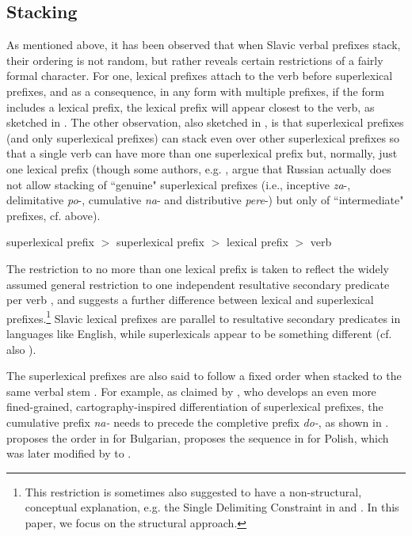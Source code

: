 \documentclass[output=paper,colorlinks,citecolor=brown]{langscibook}
\begin{document}
\subsection{Stacking}\label{sec:IntroStacking}

As mentioned above, it has been observed that when Slavic verbal prefixes stack, their ordering is not random, but rather reveals certain restrictions of a fairly formal character. For one, lexical prefixes attach  to the verb before superlexical prefixes, and as a consequence, in any form with multiple prefixes, if the form includes a lexical prefix, the lexical prefix will appear closest to the verb, as sketched in . The other observation, also sketched in , is that superlexical prefixes (and only superlexical prefixes) can stack even over other superlexical prefixes so that a single verb can have more than one superlexical prefix but, normally, just one lexical prefix \citep[cf.][]{Romanova2004,svenonius2004slavic,gehrke2008ps} (though some authors, e.g. \citealt{tatevosov2008intermediate}, argue that Russian actually does not allow stacking of ``genuine" superlexical prefixes (i.e., inceptive \textit{za}-, delimitative \textit{po}-, cumulative \textit{na}- and distributive \textit{pere}-) but only of ``intermediate" prefixes, cf. above).

\ea superlexical prefix $>$  superlexical prefix $>$ lexical prefix $>$ verb \label{ex:orderprefixes}
\z

\noindent The restriction to no more than one lexical prefix is taken to reflect the widely assumed general restriction to one independent resultative secondary predicate per verb \citep[a.o.][]{rappaport2001event,ramchand2008verb}, and suggests a further difference between lexical and superlexical prefixes.\footnote{This restriction is sometimes also suggested to have a non-structural, conceptual explanation, e.g. the Single Delimiting Constraint in \citet{tenny1994aspectual} and \citet{filip2003prefixes}. In this paper, we focus on the structural approach.} Slavic lexical prefixes are parallel to resultative secondary predicates in languages like English, while superlexicals appear to be something different (cf. also \citealt{spencer&zaretskaya1998}).


The superlexical prefixes are also said to follow a fixed order when stacked to the same verbal stem \citep{istratkova2006, wiland2012prefix, endo2014symmetric,KlimekJankowskaBlaszczak2022}. For example, as claimed by \citet{wiland2012prefix}, who develops an even more fined-grained, cartography-inspired differentiation of superlexical prefixes, the cumulative prefix \textit{na-} needs to precede the completive prefix \textit{do-}, as shown in . \citet{istratkova2006} proposes the order in  for Bulgarian, \citet{wiland2012prefix} proposes the sequence in  for Polish, which was later modified by \citet{KlimekJankowskaBlaszczak2022} to .
\end{document}
